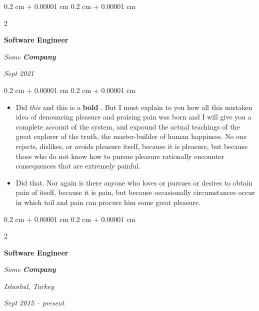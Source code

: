 \documentclass[10pt, letterpaper]{article}
\newenvironment{highlights}{
    \begin{itemize}[
        topsep=0.10 cm,
        parsep=0.10 cm,
        partopsep=0pt,
        itemsep=0pt,
        leftmargin=0.4 cm + 10pt
    ]
}{
    \end{itemize}
} %
\newenvironment{onecolentry}{
    \begin{adjustwidth}{
        0.2 cm + 0.00001 cm
    }{
        0.2 cm + 0.00001 cm
    }
}{
    \end{adjustwidth}
} %
\newenvironment{twocolentry}[2][]{
    \onecolentry
    \def\secondColumn{#2}
    \setcolumnwidth{\fill, 4.5 cm}
    \begin{paracol}{2}
}{
    \switchcolumn \raggedleft \secondColumn
    \end{paracol}
    \endonecolentry
} %
\let\hrefWithoutArrow\href
\renewcommand{\href}[2]{\hrefWithoutArrow{#1}{\ifthenelse{\equal{#2}{}}{ }{#2 }\raisebox{.15ex}{\footnotesize \faExternalLink*}}}
\begin{document}
        \vspace{0.2 cm}

            \begin{twocolentry}{


        \textit{Sept 2021}    }
                \textbf{Software Engineer}

                \textit{Some \textbf{Company}}
            \end{twocolentry}

        \vspace{0.10 cm}
        \begin{onecolentry}
            \begin{highlights}
                \item Did \textit{this} and this is a \textbf{bold} \href{https://example.com}{link}. But I must explain to you how all this mistaken idea of denouncing pleasure and praising pain was born and I will give you a complete account of the system, and expound the actual teachings of the great explorer of the truth, the master-builder of human happiness. No one rejects, dislikes, or avoids pleasure itself, because it is pleasure, but because those who do not know how to pursue pleasure rationally encounter consequences that are extremely painful.
                \item Did that. Nor again is there anyone who loves or pursues or desires to obtain pain of itself, because it is pain, but because occasionally circumstances occur in which toil and pain can procure him some great pleasure.
            \end{highlights}
        \end{onecolentry}


        \vspace{0.2 cm}

            \begin{twocolentry}{
        \textit{Istanbul, Turkey}

        \textit{Sept 2015 – present}    }
                \textbf{Software Engineer}

                \textit{Some \textbf{Company}}
            \end{twocolentry}
\end{document}
